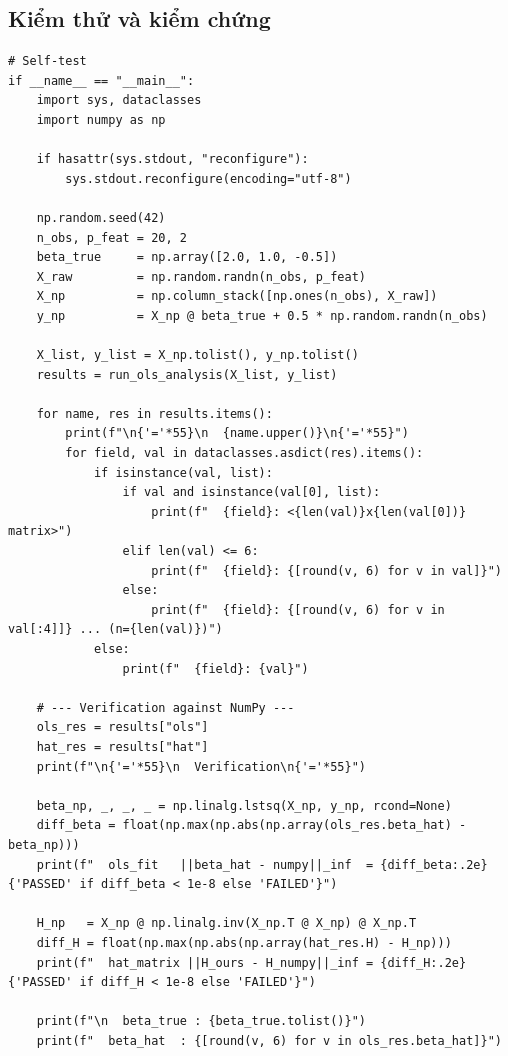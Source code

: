 \subsection{Kiểm thử và kiểm chứng}

\begin{lstlisting}[caption={Self-test va verification}, label={lst:self_test}]
# Self-test
if __name__ == "__main__":
    import sys, dataclasses
    import numpy as np

    if hasattr(sys.stdout, "reconfigure"):
        sys.stdout.reconfigure(encoding="utf-8")

    np.random.seed(42)
    n_obs, p_feat = 20, 2
    beta_true     = np.array([2.0, 1.0, -0.5])
    X_raw         = np.random.randn(n_obs, p_feat)
    X_np          = np.column_stack([np.ones(n_obs), X_raw])
    y_np          = X_np @ beta_true + 0.5 * np.random.randn(n_obs)

    X_list, y_list = X_np.tolist(), y_np.tolist()
    results = run_ols_analysis(X_list, y_list)

    for name, res in results.items():
        print(f"\n{'='*55}\n  {name.upper()}\n{'='*55}")
        for field, val in dataclasses.asdict(res).items():
            if isinstance(val, list):
                if val and isinstance(val[0], list):
                    print(f"  {field}: <{len(val)}x{len(val[0])} matrix>")
                elif len(val) <= 6:
                    print(f"  {field}: {[round(v, 6) for v in val]}")
                else:
                    print(f"  {field}: {[round(v, 6) for v in val[:4]]} ... (n={len(val)})")
            else:
                print(f"  {field}: {val}")

    # --- Verification against NumPy ---
    ols_res = results["ols"]
    hat_res = results["hat"]
    print(f"\n{'='*55}\n  Verification\n{'='*55}")

    beta_np, _, _, _ = np.linalg.lstsq(X_np, y_np, rcond=None)
    diff_beta = float(np.max(np.abs(np.array(ols_res.beta_hat) - beta_np)))
    print(f"  ols_fit   ||beta_hat - numpy||_inf  = {diff_beta:.2e}  {'PASSED' if diff_beta < 1e-8 else 'FAILED'}")

    H_np   = X_np @ np.linalg.inv(X_np.T @ X_np) @ X_np.T
    diff_H = float(np.max(np.abs(np.array(hat_res.H) - H_np)))
    print(f"  hat_matrix ||H_ours - H_numpy||_inf = {diff_H:.2e}  {'PASSED' if diff_H < 1e-8 else 'FAILED'}")

    print(f"\n  beta_true : {beta_true.tolist()}")
    print(f"  beta_hat  : {[round(v, 6) for v in ols_res.beta_hat]}")
\end{lstlisting}